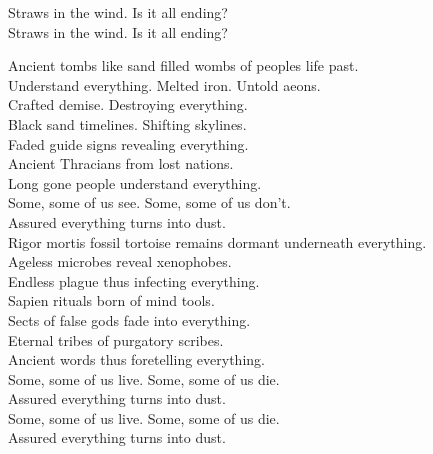 Straws in the wind. Is it all ending? \\
Straws in the wind. Is it all ending? \\




Ancient tombs like sand filled wombs of peoples life past. \\
Understand everything. Melted iron. Untold aeons. \\
Crafted demise. Destroying everything. \\

Black sand timelines. Shifting skylines. \\
Faded guide signs revealing everything. \\
Ancient Thracians from lost nations. \\
Long gone people understand everything. \\

Some, some of us see. Some, some of us don't. \\
Assured everything turns into dust. \\

Rigor mortis fossil tortoise remains dormant underneath everything. \\
Ageless microbes reveal xenophobes. \\
Endless plague thus infecting everything. \\

Sapien rituals born of mind tools. \\
Sects of false gods fade into everything. \\
Eternal tribes of purgatory scribes. \\
Ancient words thus foretelling everything. \\

Some, some of us live. Some, some of us die. \\
Assured everything turns into dust. \\
Some, some of us live. Some, some of us die. \\
Assured everything turns into dust. \\




